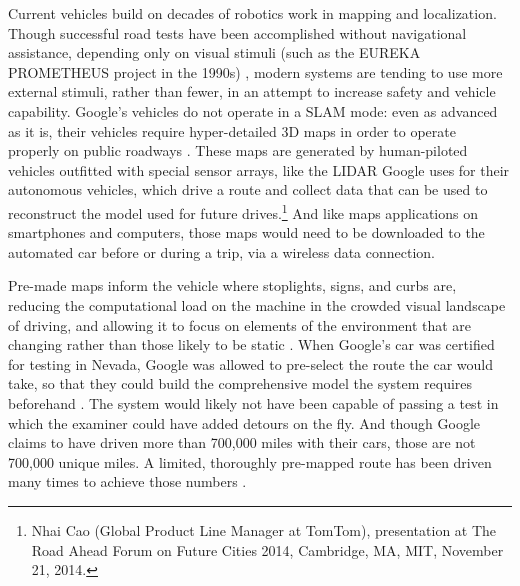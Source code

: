 
Current vehicles build on decades of robotics work in mapping and localization. Though successful
road tests have been accomplished without navigational assistance,
depending only on visual stimuli (such as the EUREKA PROMETHEUS project
in the 1990s) \cite{ulmerVITA}, modern systems are tending to use more external
stimuli, rather than fewer, in an attempt to increase safety and
vehicle capability. Google's vehicles do not operate in a SLAM mode: even as
advanced as it is, their vehicles require
hyper-detailed 3D maps in order to operate properly on public
roadways \cite{gomesObstacles}. These maps are generated by human-piloted vehicles outfitted with
special sensor arrays, like the LIDAR Google uses for their autonomous
vehicles, which drive a route and collect data that can be used to
reconstruct the model used for future drives.\footnote{Nhai Cao
  (Global Product Line Manager at TomTom), presentation at The Road
  Ahead Forum on Future Cities 2014, Cambridge, MA, MIT, November 21,
  2014.} And like maps applications on smartphones and computers,
those maps would need to be downloaded to the automated car before or
during a trip, via a wireless data connection.


Pre-made maps inform the vehicle where stoplights, signs,
and curbs are, reducing the computational load on the machine in the
crowded visual landscape of driving, and allowing it to focus on
elements of the environment that are changing rather than those likely
to be static \cite{gomesObstacles}. When Google's car was certified for
testing in Nevada, Google was allowed to pre-select the route the car
would take, so that they could build the comprehensive model the
system requires beforehand \cite{harrisNevada}. The system would likely not have been
capable of passing a test in which the examiner could have added
detours on the fly. And though Google claims to have driven more than
700,000 miles with their cars, those are not 700,000 unique miles. A
limited, thoroughly pre-mapped route has been driven many times to
achieve those numbers \cite{gomesCircles}.

